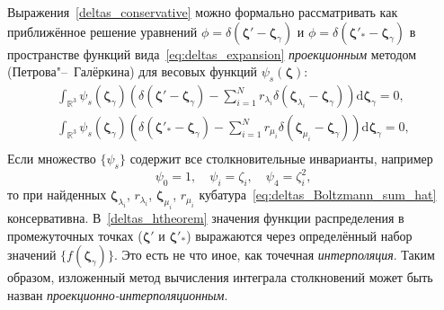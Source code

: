 \documentclass{article}
\newcommand{\dd}{\mathrm{d}}
\newcommand{\dzeta}{\boldsymbol{\dd\zeta}}
\newcommand{\bzeta}{\boldsymbol{\zeta}}
\begin{document}
Выражения~\eqref{deltas_conservative} можно формально рассматривать как приближённое решение уравнений
\(\phi=\delta(\bzeta'-\bzeta_\gamma)\) и \(\phi=\delta(\bzeta'_*-\bzeta_\gamma)\)
в пространстве функций вида~\eqref{eq:deltas_expansion}
\emph{проекционным} методом (Петрова"--~Галёркина) для весовых функций \(\psi_s(\bzeta)\):
\begin{gather}
    \int_{\mathbb{R}^3} \psi_s(\bzeta_\gamma) \left( \delta(\bzeta'-\bzeta_\gamma)
        - \sum_{i=1}^N r_{\lambda_i} \delta(\bzeta_{\lambda_i}-\bzeta_\gamma) \right) \dzeta_\gamma = 0, \label{lambda_galerkin}\\
    \int_{\mathbb{R}^3} \psi_s(\bzeta_\gamma) \left( \delta(\bzeta'_*-\bzeta_\gamma)
        - \sum_{i=1}^N r_{\mu_i} \delta(\bzeta_{\mu_i}-\bzeta_\gamma) \right) \dzeta_\gamma = 0, \label{mu_galerkin}\\
\end{gather}
Если множество \(\{\psi_s\}\) содержит все столкновительные инварианты, например
\begin{equation}\label{collision_invariants}
    \psi_0 = 1, \quad \psi_i = \zeta_i, \quad \psi_4 = \zeta_i^2,
\end{equation}
то при найденных \(\bzeta_{\lambda_i}\), \(r_{\lambda_i}\), \(\bzeta_{\mu_i}\), \(r_{\mu_i}\)
кубатура~\eqref{eq:deltas_Boltzmann_sum_hat} консервативна.
В~\eqref{deltas_htheorem} значения функции распределения в промежуточных точках (\(\bzeta'\) и \(\bzeta'_*\))
выражаются через определённый набор значений \(\{f(\bzeta_\gamma)\}\).
Это есть не что иное, как точечная \emph{интерполяция}.
Таким образом, изложенный метод вычисления интеграла столкновений может быть назван \emph{проекционно-интерполяционным}.
\end{document}
